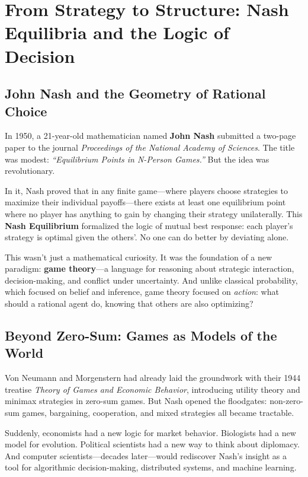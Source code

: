 \section{From Strategy to Structure: Nash Equilibria and the Logic of Decision}

\subsection{John Nash and the Geometry of Rational Choice}

In 1950, a 21-year-old mathematician named \textbf{John Nash} submitted a two-page paper to the journal \textit{Proceedings of the National Academy of Sciences}. The title was modest: \textit{“Equilibrium Points in N-Person Games.”} But the idea was revolutionary.

In it, Nash proved that in any finite game—where players choose strategies to maximize their individual payoffs—there exists at least one equilibrium point where no player has anything to gain by changing their strategy unilaterally. This \textbf{Nash Equilibrium} formalized the logic of mutual best response: each player’s strategy is optimal given the others’. No one can do better by deviating alone.

This wasn’t just a mathematical curiosity. It was the foundation of a new paradigm: \textbf{game theory}—a language for reasoning about strategic interaction, decision-making, and conflict under uncertainty. And unlike classical probability, which focused on belief and inference, game theory focused on \emph{action}: what should a rational agent do, knowing that others are also optimizing?

\subsection{Beyond Zero-Sum: Games as Models of the World}

Von Neumann and Morgenstern had already laid the groundwork with their 1944 treatise \textit{Theory of Games and Economic Behavior}, introducing utility theory and minimax strategies in zero-sum games. But Nash opened the floodgates: non-zero-sum games, bargaining, cooperation, and mixed strategies all became tractable.

Suddenly, economists had a new logic for market behavior. Biologists had a new model for evolution. Political scientists had a new way to think about diplomacy. And computer scientists—decades later—would rediscover Nash’s insight as a tool for algorithmic decision-making, distributed systems, and machine learning.

